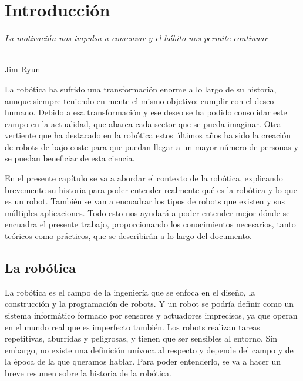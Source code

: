 \chapter{Introducción}
\label{cap:capitulo1}
\setcounter{page}{1}

\begin{flushright}
\begin{minipage}[]{10cm}
\emph{La motivación nos impulsa a comenzar y el hábito nos permite continuar}\\
\end{minipage}\\

Jim Ryun\\
\end{flushright}

\vspace{1cm}

La robótica ha sufrido una transformación enorme a lo largo de su historia, aunque siempre teniendo en mente el mismo objetivo: cumplir con el deseo humano. Debido a esa transformación y ese deseo se ha podido consolidar este campo en la actualidad, que abarca cada sector que se pueda imaginar. Otra vertiente que ha destacado en la robótica estos últimos años ha sido la creación de robots de bajo coste para que puedan llegar a un mayor número de personas y se puedan beneficiar de esta ciencia. 

En el presente capítulo se va a abordar el contexto de la robótica, explicando brevemente su historia para poder entender realmente qué es la robótica y lo que es un robot. También se van a encuadrar los tipos de robots que existen y sus múltiples aplicaciones. Todo esto nos ayudará a poder entender mejor dónde se encuadra el presente trabajo, proporcionando los conocimientos necesarios, tanto teóricos como prácticos, que se describirán a lo largo del documento.

\section{La robótica}
\label{sec:robotica} %

La robótica es el campo de la ingeniería que se enfoca en el diseño, la construcción y la programación de robots. Y un robot se podría definir como un sistema informático formado por sensores y actuadores imprecisos, ya que operan en el mundo real que es imperfecto también. Los robots realizan tareas repetitivas, aburridas y peligrosas, y tienen que ser sensibles al entorno. Sin embargo, no existe una definición unívoca al respecto y depende del campo y de la época de la que queramos hablar. Para poder entenderlo, se va a hacer un breve resumen sobre la historia de la robótica.

